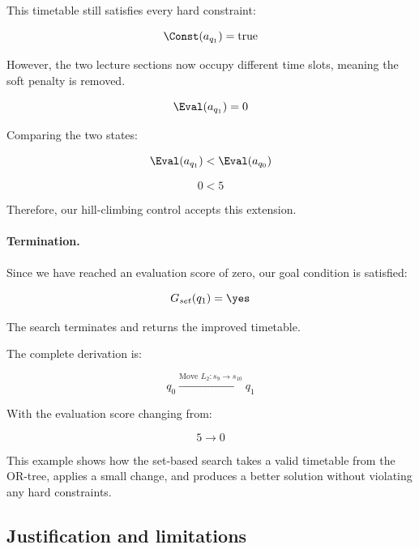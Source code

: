 This timetable still satisfies every hard constraint:

\begin{equation}
    \Const(a_{q_1})=\mathrm{true}
\end{equation}

However, the two lecture sections now occupy different time slots, meaning the soft penalty is removed.

\begin{equation}
    \Eval(a_{q_1})=0
\end{equation}

Comparing the two states:

\begin{equation}
    \Eval(a_{q_1})<
    \Eval(a_{q_0})
\end{equation}

\begin{equation}
    0<5
\end{equation}

Therefore, our hill-climbing control accepts this extension.

\paragraph{Termination.}

Since we have reached an evaluation score of zero, our goal condition is satisfied:

\begin{equation}
    G_{set}(q_1)=\yes
\end{equation}

The search terminates and returns the improved timetable.

The complete derivation is:

\begin{equation}
    q_0
    \xrightarrow{
    \text{Move }L_2:s_9\rightarrow s_{10}
    }
    q_1
\end{equation}

With the evaluation score changing from:

\begin{equation}
    5\longrightarrow 0
\end{equation}

This example shows how the set-based search takes a valid timetable from the OR-tree, applies a small change, and produces a better solution without violating any hard constraints.

\subsection{Justification and limitations}


